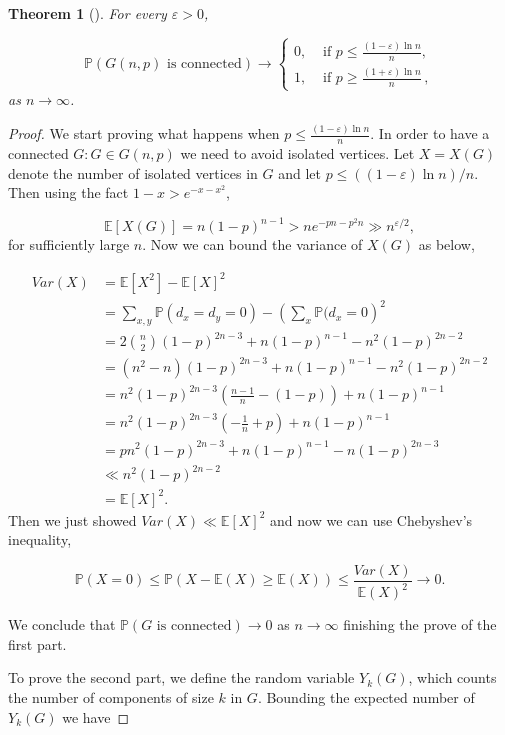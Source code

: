 \documentclass[12pt,twoside,a4paper,bibliography=totocnumbered]{book}
\numberwithin{equation}{section}
\let\log=\ln
\newtheorem{theorem}             {Theorem}[section]
\theoremstyle{remark}
\begin{document}
\begin{theorem}[\cite{ReEr60}]
For every $\varepsilon > 0$,

$$
\mathbb{P}(G(n,p)\text{ is connected}) \rightarrow 
\begin{cases}
		0, &\text{ if }p \leq \frac{(1 - \varepsilon) \log n}{n},\\
		1, &\text{ if }p \geq \frac{(1 + \varepsilon) \log n}{n}\,,
\end{cases}
$$
as $n \rightarrow \infty$.
\end{theorem}
\begin{proof}
We start proving what happens when $p \leq \frac{(1 - \varepsilon) \log n}{n}$. In order to have a connected $G\colon G \in G(n,p)$ we need to avoid isolated vertices. Let $X=X(G)$ denote the number of isolated vertices in $G$ and let $p\leq((1-\varepsilon) \log n) /n$. Then using the fact $1-x > e^{-x-x^2}$,

$$ \mathbb{E}[X(G)] = n(1-p)^{n-1} > ne^{-pn-p^2n} \gg n^{\varepsilon/2},$$
for sufficiently large $n$. Now we can bound the variance of $X(G)$ as below,

\begin{align*}
Var(X) &= \mathbb{E}[X^2 ] - \mathbb{E}[X]^2\\
&= \sum_{x,y} \mathbb{P}(d_x = d_y =0) - \left( \sum_x \mathbb{P}(d_x = 0\right)^2\\
& = 2\binom{n}{2} (1-p)^{2n-3} + n(1-p)^{n-1} - n^2(1-p)^{2n-2}\\
& = (n^2 - n)(1-p)^{2n-3} + n(1-p)^{n-1} - n^2(1-p)^{2n-2}\\
& = n^2(1-p)^{2n-3}\left( \frac{n-1}{n} - (1-p) \right) + n(1-p)^{n-1}\\
& = n^2(1-p)^{2n-3}\left( -\frac{1}{n} + p \right) + n(1-p)^{n-1}\\
& = pn^2 (1-p)^{2n-3} + n(1-p)^{n-1} - n(1-p)^{2n-3}\\
& \ll n^2 (1-p)^{2n-2}\\
& = \mathbb{E}[X]^2.
\end{align*}
Then we just showed $Var(X) \ll \mathbb{E}[X]^2$ and now we can use Chebyshev's  inequality,

$$\mathbb{P}(X=0) \leq \mathbb{P} (X-\mathbb{E}(X) \geq \mathbb{E}(X)) \leq \frac{Var(X)}{\mathbb{E}(X)^2} \rightarrow 0.$$

We conclude that $\mathbb{P}(G\text{ is connected}) \rightarrow 0$ as $n \rightarrow \infty$ finishing the prove of the first part.

To prove the second part, we define the random variable $Y_k(G)$, which counts the number of components of size $k$ in $G$. Bounding the expected number of $Y_k(G)$ we have


\end{proof}
\end{document}
